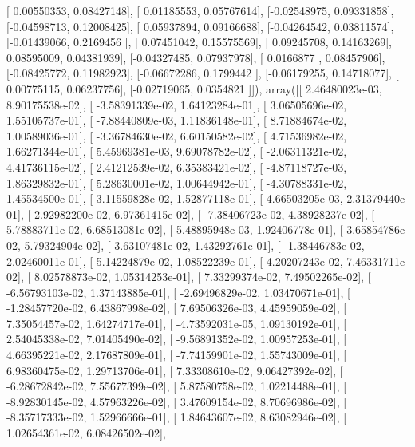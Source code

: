 \documentclass{article}
\begin{document}
       [ 0.00550353,  0.08427148],
       [ 0.01185553,  0.05767614],
       [-0.02548975,  0.09331858],
       [-0.04598713,  0.12008425],
       [ 0.05937894,  0.09166688],
       [-0.04264542,  0.03811574],
       [-0.01439066,  0.2169456 ],
       [ 0.07451042,  0.15575569],
       [ 0.09245708,  0.14163269],
       [ 0.08595009,  0.04381939],
       [-0.04327485,  0.07937978],
       [ 0.0166877 ,  0.08457906],
       [-0.08425772,  0.11982923],
       [-0.06672286,  0.1799442 ],
       [-0.06179255,  0.14718077],
       [ 0.00775115,  0.06237756],
       [-0.02719065,  0.0354821 ]]), array([[  2.46480023e-03,   8.90175538e-02],
       [ -3.58391339e-02,   1.64123284e-01],
       [  3.06505696e-02,   1.55105737e-01],
       [ -7.88440809e-03,   1.11836148e-01],
       [  8.71884674e-02,   1.00589036e-01],
       [ -3.36784630e-02,   6.60150582e-02],
       [  4.71536982e-02,   1.66271344e-01],
       [  5.45969381e-03,   9.69078782e-02],
       [ -2.06311321e-02,   4.41736115e-02],
       [  2.41212539e-02,   6.35383421e-02],
       [ -4.87118727e-03,   1.86329832e-01],
       [  5.28630001e-02,   1.00644942e-01],
       [ -4.30788331e-02,   1.45534500e-01],
       [  3.11559828e-02,   1.52877118e-01],
       [  4.66503205e-03,   2.31379440e-01],
       [  2.92982200e-02,   6.97361415e-02],
       [ -7.38406723e-02,   4.38928237e-02],
       [  5.78883711e-02,   6.68513081e-02],
       [  5.48895948e-03,   1.92406778e-01],
       [  3.65854786e-02,   5.79324904e-02],
       [  3.63107481e-02,   1.43292761e-01],
       [ -1.38446783e-02,   2.02460011e-01],
       [  5.14224879e-02,   1.08522239e-01],
       [  4.20207243e-02,   7.46331711e-02],
       [  8.02578873e-02,   1.05314253e-01],
       [  7.33299374e-02,   7.49502265e-02],
       [ -6.56793103e-02,   1.37143885e-01],
       [ -2.69496829e-02,   1.03470671e-01],
       [ -1.28457720e-02,   6.43867998e-02],
       [  7.69506326e-03,   4.45959059e-02],
       [  7.35054457e-02,   1.64274717e-01],
       [ -4.73592031e-05,   1.09130192e-01],
       [  2.54045338e-02,   7.01405490e-02],
       [ -9.56891352e-02,   1.00957253e-01],
       [  4.66395221e-02,   2.17687809e-01],
       [ -7.74159901e-02,   1.55743009e-01],
       [  6.98360475e-02,   1.29713706e-01],
       [  7.33308610e-02,   9.06427392e-02],
       [ -6.28672842e-02,   7.55677399e-02],
       [  5.87580758e-02,   1.02214488e-01],
       [ -8.92830145e-02,   4.57963226e-02],
       [  3.47609154e-02,   8.70696986e-02],
       [ -8.35717333e-02,   1.52966666e-01],
       [  1.84643607e-02,   8.63082946e-02],
       [  1.02654361e-02,   6.08426502e-02],
\end{document}

